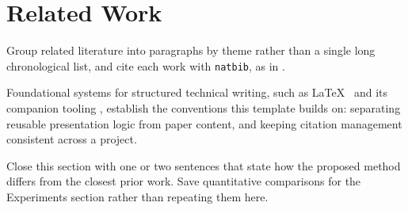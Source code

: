 \section{Related Work}

Group related literature into paragraphs by theme rather than a single long
chronological list, and cite each work with \texttt{natbib}, as in
\cite{lamport1994latex,mittelbach2004latex}.

Foundational systems for structured technical writing, such as
\LaTeX{}~\cite{lamport1994latex} and its companion tooling
\cite{mittelbach2004latex}, establish the conventions this template builds
on: separating reusable presentation logic from paper content, and keeping
citation management consistent across a project.

Close this section with one or two sentences that state how the proposed
method differs from the closest prior work. Save quantitative comparisons
for the Experiments section rather than repeating them here.
